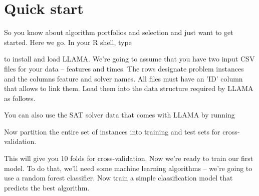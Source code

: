 \documentclass{article}
\begin{document}
\section*{Quick start}

So you know about algorithm portfolios and selection and just want to get
started. Here we go. In your R shell, type

\begin{knitrout}
\color{fgcolor}\begin{kframe}
\begin{alltt}
\hldef{(}\hldef{)}
\end{alltt}
\end{kframe}
\end{knitrout}

to install and load LLAMA. We're going to assume that you have two input CSV
files for your data -- features and times. The rows designate problem instances
and the columns feature and solver names. All files must have an 'ID' column
that allows to link them. Load them into the data structure required by LLAMA as
follows.

\begin{knitrout}
\color{fgcolor}\begin{kframe}
\begin{alltt}
 \hlkwb{=} \hldef{(}\hldef{(}\hldef{),} \hldef{(}\hldef{))}
\end{alltt}
\end{kframe}
\end{knitrout}

You can also use the SAT solver data that comes with LLAMA by running

\begin{knitrout}
\color{fgcolor}\begin{kframe}
\begin{alltt}
 \hlkwb{=} 
\end{alltt}
\end{kframe}
\end{knitrout}

Now partition the entire set of instances into training and test sets for
cross-validation.

\begin{knitrout}
\color{fgcolor}\begin{kframe}
\begin{alltt}
 \hlkwb{=} 
\end{alltt}
\end{kframe}
\end{knitrout}

This will give you 10 folds for cross-validation. Now we're ready to train
our first model. To do that, we'll need some machine learning algorithms --
we're going to use a random forest classifier. Now train a simple classification
model that predicts the best algorithm.
\end{document}
